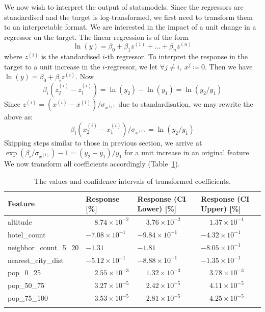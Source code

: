 \documentclass[11pt,a4paper]{article}
\begin{document}
We now wish to interpret the output of statsmodels. Since the regressors are standardised and the target is log-transformed, we first need to transform them to an interpretable format. We are interested in the impact of a unit change in a regressor on the target. The linear regression is of the form 
$$\ln(y) = \beta_0+\beta_1z^{(1)}+ \dots + \beta_n z^{(n)}$$ 
where $z^{(i)}$ is the standardised $i$-th regressor. To interpret the response in the target to a unit increase in the $i$-regressor, we let $\forall j \neq i,\ x^j \coloneqq 0$. Then we have $\ln(y) = \beta_0 + \beta_i z^{(i)}$. Now 
$$\beta_i (z_2^{(i)} - z_1^{(i)}) = \ln(y_2) - \ln(y_1)=\ln(y_2/y_1)$$
Since 
$z^{(i)} = (x^{(i)} - \overline{x}^{(i)})/\sigma_{x^{(i)}}$
due to standardisation, we may rewrite the above as: $$\beta_i (x_2^{(i)} - x_1^{(i)})/\sigma_{x^{(i)}} =\ln(y_2/y_1)$$
Skipping steps similar to those in previous section, we arrive at $\exp(\beta_i / \sigma_{x^{(i)}}) - 1 = (y_2 - y_1) / y_1$ for a unit increase in an original feature. We now transform all coefficients accordingly (Table~\ref{table:2}).
\begin{table} [h!]
\centering
\caption{The values and confidence intervals of transformed coefficients.}
\begin{tabular}{l l l l}
\toprule
    Feature & 
    Response [\%] & 
    Response (CI Lower) [\%] & 
    Response (CI Upper) [\%] \\
\midrule
altitude & $\phantom{-}8.74 \times 10^{-2}$ & $\phantom{-}3.76\times 10^{-2}$ & $\phantom{-}1.37\times 10^{-1}$ \\
hotel\_count & $-7.08\times 10^{-1}$ & $-9.84\times 10^{-1}$ & $-4.32\times 10^{-1}$ \\
neighbor\_count\_5\_20 & $-1.31$ & $-1.81$ & $-8.05\times 10^{-1}$ \\
nearest\_city\_dist & $-5.12\times 10^{-1}$ & $-8.88\times 10^{-1}$ & $-1.35\times 10^{-1}$ \\
pop\_0\_25 & $\phantom{-}2.55 \times 10^{-3}$ & $\phantom{-}1.32\times 10^{-3}$ & $\phantom{-}3.78\times 10^{-3}$ \\
pop\_50\_75 & $\phantom{-}3.27 \times 10^{-5}$ & $\phantom{-}2.42\times 10^{-5}$ &  $\phantom{-}4.11\times 10^{-5}$ \\
pop\_75\_100 & $\phantom{-}3.53 \times 10^{-5}$ & $\phantom{-}2.81\times 10^{-5}$ &  $\phantom{-}4.25\times 10^{-5}$\\
\bottomrule
\label{table:2}
\end{tabular}
\end{table}
\end{document}
